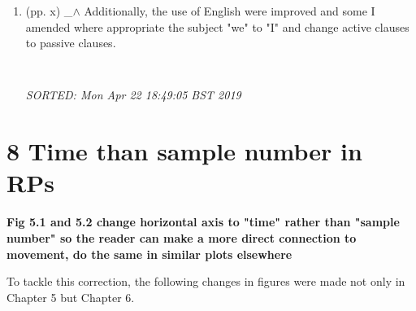 \documentclass[12pt]{article}
\begin{document}
\begin{enumerate}
\item  (pp. x)  \_$\wedge$  
	Additionally, the use of English were improved 
	and some I amended where appropriate the subject "we" to "I" 
	and change active clauses to passive clauses.
	\begin{verbatim}
	
	\end{verbatim}
	\textit{
	SORTED:  Mon Apr 22 18:49:05 BST 2019
	}
	\\

%
%	
%
%



\end{enumerate}














\section*{8 Time than sample number in RPs}
\textbf{
Fig 5.1 and 5.2 change horizontal axis to
"time" rather than "sample number" so the reader
can make a more direct connection to movement,
do the same in similar plots elsewhere
}

To tackle this correction, the following changes 
in figures were made not only in Chapter 5 but Chapter 6.
\end{document}
